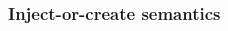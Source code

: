     \begin{frame}[t]\frametitle{Inject-or-create semantics}
      \begin{columns}
        \begin{column}{0.5\textwidth}
          \vspace{-20pt}
          \vspace{-20pt}
          \begin{figure}
            \def\svgwidth{150pt}
          \end{figure}
          \vspace{-20pt}
        \end{column}
        \begin{column}{0.5\textwidth}
          \vspace{-30pt}
          \begin{figure}
            \def\svgwidth{150pt}
          \end{figure}
          \vspace{-30pt}
          \begin{figure}
            \def\svgwidth{150pt}
          \end{figure}    
        \end{column}
      \end{columns}
    \end{frame}
    \note{}

  
